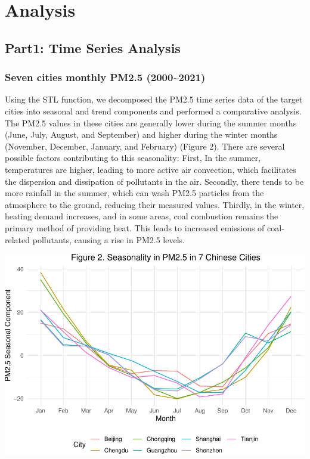 \documentclass[
  12pt,
]{article}
\begin{document}
\newpage

\hypertarget{analysis}{%
\section{Analysis}\label{analysis}}

\hypertarget{part1-time-series-analysis}{%
\subsection{Part1: Time Series
Analysis}\label{part1-time-series-analysis}}

\hypertarget{seven-cities-monthly-pm2.5-20002021}{%
\subsubsection{Seven cities monthly PM2.5
(2000\textasciitilde2021)}\label{seven-cities-monthly-pm2.5-20002021}}

Using the STL function, we decomposed the PM2.5 time series data of the
target cities into seasonal and trend components and performed a
comparative analysis. The PM2.5 values in these cities are generally
lower during the summer months (June, July, August, and September) and
higher during the winter months (November, December, January, and
February) (Figure 2). There are several possible factors contributing to
this seasonality: First, In the summer, temperatures are higher, leading
to more active air convection, which facilitates the dispersion and
dissipation of pollutants in the air. Secondly, there tends to be more
rainfall in the summer, which can wash PM2.5 particles from the
atmosphere to the ground, reducing their measured values. Thirdly, in
the winter, heating demand increases, and in some areas, coal combustion
remains the primary method of providing heat. This leads to increased
emissions of coal-related pollutants, causing a rise in PM2.5 levels.

\includegraphics{LiFangRenZhang_ENV872_Project_files/figure-latex/seasonal figure-1.pdf}
\end{document}
